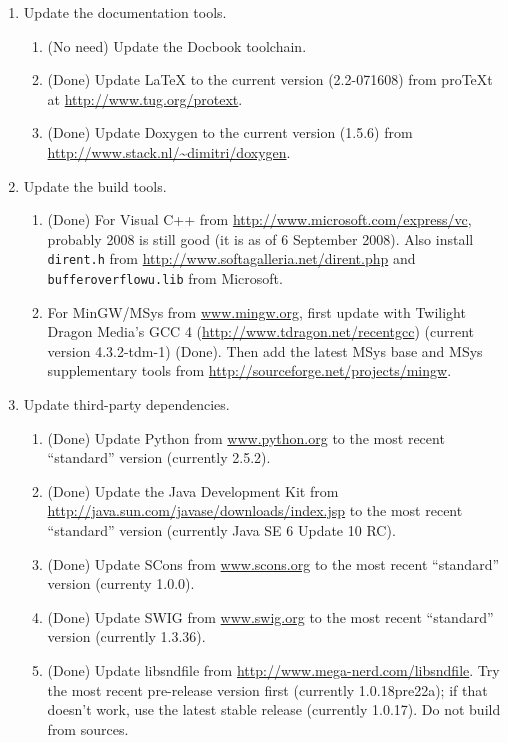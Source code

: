 \documentclass[11pt,letterpaper,onecolumn]{scrartcl}
\begin{document}
\begin{sloppypar}
\begin{enumerate}
	\item Update the documentation tools.
		\begin{enumerate}
	    \item (No need) Update the Docbook toolchain.
	    \item (Done) Update LaTeX to the current version (2.2-071608) from proTeXt at \url{http://www.tug.org/protext}.
	    \item (Done) Update Doxygen to the current version (1.5.6) from \url{http://www.stack.nl/~dimitri/doxygen}.
		\end{enumerate}
	\item Update the build tools.   
		\begin{enumerate}
			\item (Done) For Visual C++ from \url{http://www.microsoft.com/express/vc}, probably 2008 is still good (it is as of 6 September 2008). Also install \texttt{dirent.h} from \url{http://www.softagalleria.net/dirent.php} and \texttt{bufferoverflowu.lib}  from Microsoft.
			\item For MinGW/MSys from \url{www.mingw.org}, first update with Twilight Dragon Media's GCC 4 (\url{http://www.tdragon.net/recentgcc}) (current version 4.3.2-tdm-1) (Done). Then add the latest MSys base and MSys supplementary tools from \url{http://sourceforge.net/projects/mingw}.
		\end{enumerate}    
	\item Update third-party dependencies.   
		\begin{enumerate}
  		\item (Done) Update Python from \url{www.python.org} to the most recent ``standard'' version (currently 2.5.2).
	    \item (Done) Update the Java Development Kit from \url{http://java.sun.com/javase/downloads/index.jsp} to the most recent ``standard'' version (currently Java SE 6 Update 10 RC).
	    \item (Done) Update SCons from \url{www.scons.org} to the most recent ``standard'' version (currenty 1.0.0).
	    \item (Done) Update SWIG from \url{www.swig.org} to the most recent ``standard'' version (currently 1.3.36).
			\item (Done) Update libsndfile from \url{http://www.mega-nerd.com/libsndfile}. Try the most recent pre-release version first (currently 1.0.18pre22a); if that doesn't work, use the latest stable release (currently 1.0.17). Do not build from sources. 

\end{enumerate}
\end{enumerate}
\end{sloppypar}
\end{document}
